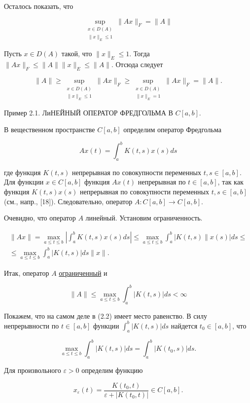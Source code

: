 \documentclass[a4paper, 12pt]{extarticle}
\begin{document}
Осталось показать, что

$$
	\sup _{\substack{x \in D(A) \\\|x\|_{E} \leq 1}}\|A x\|_{F}=\|A\|
$$

Пусть $x \in D(A)$ такой, что $\|x\|_{E} \leq 1$. Тогда $\|A x\|_{F} \leq\|A\|\|x\|_{E} \leq\|A\|$. Отсюда следует

$$
	\|A\| \geq \sup _{\substack{x \in D(A) \\\|x\|_{E} \leq 1}}\|A x\|_{F} \geq \sup _{\substack{x \in D(A) \\\|x\|_{E}=1}}\|A x\|_{F}=\|A\| .
$$

Пример 2.1. ЛиНЕЙНЫЙ ОПЕРАТОР ФРЕДГОЛЬМА В $C[a, b]$.

В вещественном пространстве $C[a, b]$ определим оператор Фредгольма

$$
	A x(t)=\int_{a}^{b} K(t, s) x(s) d s
$$

где функция $K(t, s)$ непрерывная по совокупности переменных $t, s \in[a, b]$. Для функции $x \in C[a, b]$ функция $A x(t)$ непрерывная по $t \in[a, b]$, так как функция $K(t, s) x(s)$ непрерывная по совокупности переменных $t, s \in[a, b]$ (см., напр., [18]). Следовательно, оператор $A: C[a, b] \rightarrow C[a, b]$.

Очевидно, что оператор $A$ линейный. Установим ограниченность.

$$
	\begin{gathered}
		\|A x\|=\max _{a \leq t \leq b}\left|\int_{a}^{b} K(t, s) x(s) d s\right| \leq \max _{a \leq t \leq b} \int_{a}^{b}|K(t, s) \| x(s)| d s \leq \\
		\leq \max _{a \leq t \leq b} \int_{a}^{b}|K(t, s)| d s\|x\| .
	\end{gathered}
$$

Итак, оператор $A$ \hyperlink{ogranichenn}{ограниченный} и

$$
	\|A\| \leq \max _{a \leq t \leq b} \int_{a}^{b}|K(t, s)| d s<\infty
$$

Покажем, что на самом деле в (2.2) имеет место равенство. В силу непрерывности по $t \in[a, b]$ функции $\int_{a}^{b}|K(t, s)| d s$ найдется $t_{0} \in[a, b]$, что

$$
	\max _{a \leq t \leq b} \int_{a}^{b}|K(t, s)| d s=\int_{a}^{b}\left|K\left(t_{0}, s\right)\right| d s .
$$

Для произвольного $\varepsilon>0$ определим функцию

$$
	x_{\varepsilon}(t)=\frac{K\left(t_{0}, t\right)}{\varepsilon+\left|K\left(t_{0}, t\right)\right|} \in C[a, b] .
$$
\end{document}
